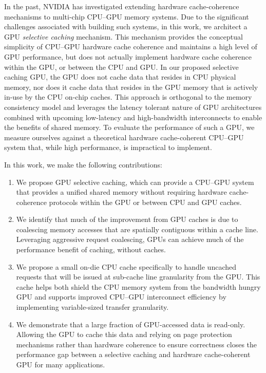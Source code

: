 In the past, NVIDIA has investigated extending hardware cache-coherence 
mechanisms to multi-chip CPU--GPU memory systems. Due to the significant challenges
associated with building such systems, in this work, we architect a GPU \textit{selective caching} 
mechanism. This mechanism provides the conceptual simplicity of CPU--GPU hardware cache coherence and
maintains a high level of GPU performance, but does not actually implement
hardware cache coherence within the GPU, or between the CPU and GPU. In our proposed 
selective caching GPU, the GPU does not cache data that resides in CPU physical 
memory, nor does it cache data that resides in the GPU memory that is 
actively in-use by the CPU on-chip caches. This approach is orthogonal to the memory
consistency model and leverages the latency tolerant nature of GPU architectures combined with upcoming low-latency and 
high-bandwidth interconnects to enable the benefits of shared memory.  To evaluate the performance
of such a GPU, we measure ourselves against a theoretical hardware
cache-coherent CPU--GPU system that, 
while high performance, is impractical to implement.

In this work, we make the following contributions:

\begin{enumerate}
\vspace{-.025in}
\item
We propose GPU selective caching, which can provide a CPU--GPU system that provides a 
unified shared memory without requiring hardware cache-coherence protocols within the GPU
or between CPU and GPU caches.
\vspace{-.025in}
\item
We identify that much of the improvement from GPU caches is due to coalescing 
memory accesses that are spatially contiguous within a cache line.  Leveraging
aggressive request coalescing, GPUs can achieve much of the performance benefit
of caching, without caches.
\vspace{-.025in}
\item
We propose a small on-die CPU cache specifically to handle uncached requests
that will be issued at sub-cache line granularity from the GPU. This cache helps both 
shield the CPU memory system from the bandwidth hungry GPU and supports
improved CPU--GPU interconnect efficiency by implementing variable-sized transfer granularity.
\vspace{-.025in}
\item
We demonstrate that a large fraction of GPU-accessed data is read-only. Allowing 
the GPU to cache this data and relying on page protection mechanisms rather than hardware 
coherence to ensure correctness closes the performance gap between a selective
caching and hardware cache-coherent GPU for many applications.
\vspace{-.025in}
\end{enumerate}
